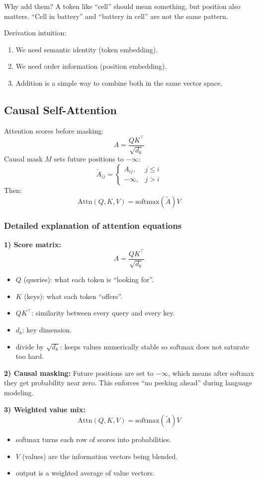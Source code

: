 \documentclass[a4paper,11pt]{article}
\begin{document}
Why add them? A token like ``cell'' should mean something, but position also matters.
``Cell in battery'' and ``battery in cell'' are not the same pattern.

Derivation intuition:
\begin{enumerate}[leftmargin=1.5em]
    \item We need semantic identity (token embedding).
    \item We need order information (position embedding).
    \item Addition is a simple way to combine both in the same vector space.
\end{enumerate}

\subsection{Causal Self-Attention}
Attention scores before masking:
\[
A = \frac{QK^\top}{\sqrt{d_k}}
\]
Causal mask $M$ sets future positions to $-\infty$:
\[
\tilde{A}_{ij} =
\begin{cases}
A_{ij}, & j \le i \\
-\infty, & j > i
\end{cases}
\]
Then:
\[
\text{Attn}(Q,K,V)=\text{softmax}(\tilde{A})V
\]

\subsubsection{Detailed explanation of attention equations}
\textbf{1) Score matrix:}
\[
A = \frac{QK^\top}{\sqrt{d_k}}
\]
\begin{itemize}[leftmargin=1.5em]
    \item $Q$ (queries): what each token is ``looking for''.
    \item $K$ (keys): what each token ``offers''.
    \item $QK^\top$: similarity between every query and every key.
    \item $d_k$: key dimension.
    \item divide by $\sqrt{d_k}$: keeps values numerically stable so softmax does not saturate too hard.
\end{itemize}

\textbf{2) Causal masking:}
Future positions are set to $-\infty$, which means after softmax they get probability near zero.
This enforces ``no peeking ahead'' during language modeling.

\textbf{3) Weighted value mix:}
\[
\text{Attn}(Q,K,V)=\text{softmax}(\tilde{A})V
\]
\begin{itemize}[leftmargin=1.5em]
    \item softmax turns each row of scores into probabilities.
    \item $V$ (values) are the information vectors being blended.
    \item output is a weighted average of value vectors.
\end{itemize}
\end{document}

